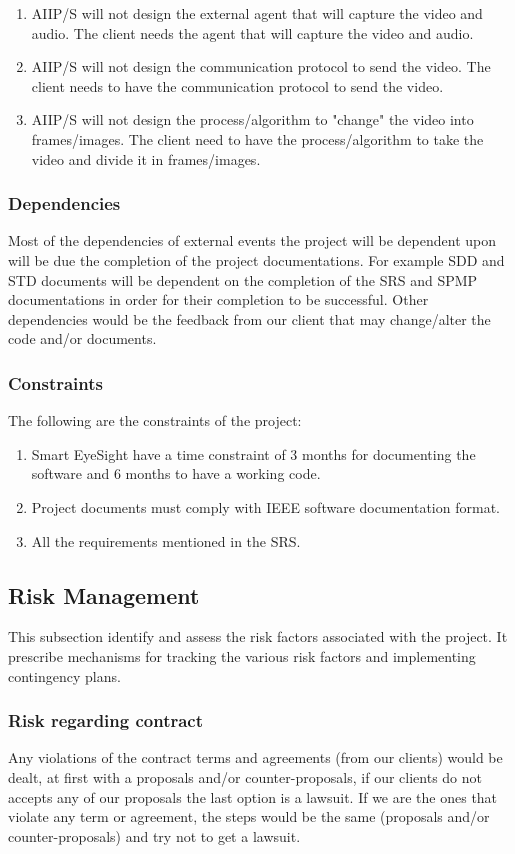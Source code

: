 \documentclass[12pt]{article}
\begin{document}
\begin{enumerate}
  \item AIIP/S will not design the external agent that will capture the video and audio. The client needs the agent that will capture the video and audio.
  \item AIIP/S will not design the communication protocol to send the video. The client needs to have the communication protocol to send the video.
  \item AIIP/S will not design the process/algorithm to "change" the video into frames/images. The client need to have the process/algorithm to take the video and divide it in frames/images.
\end{enumerate}

\subsubsection{Dependencies}
Most of the dependencies of external events the project will be dependent upon will be due the completion of the project documentations. For example SDD and STD documents will be dependent on the completion of the SRS and SPMP documentations in order for their completion to be successful. Other dependencies would be the feedback from our client that may change/alter the code and/or documents.

\subsubsection{Constraints}
The following are the constraints of the project:
\begin{enumerate}
  \item Smart EyeSight have a time constraint of 3 months for documenting the software and 6 months to have a working code.
  \item Project documents must comply with IEEE software documentation format.
  \item All the requirements mentioned in the SRS.
\end{enumerate}

\subsection{Risk Management}
This subsection identify and assess the risk factors associated with the project. It prescribe mechanisms for tracking the various risk factors and implementing contingency plans.

\subsubsection{Risk regarding contract}
Any violations of the contract terms and agreements (from our clients) would be dealt, at first with a proposals and/or counter-proposals, if our clients do not accepts any of our proposals the last option is a lawsuit. If we are the ones that violate any term or agreement, the steps would be the same (proposals and/or counter-proposals) and try not to get a lawsuit.
\end{document}
